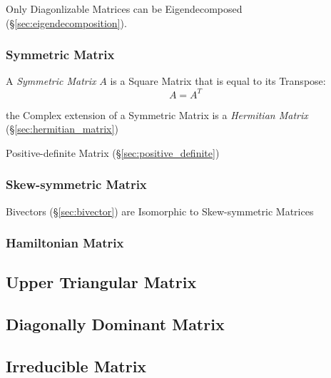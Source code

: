 Only Diagonlizable Matrices can be Eigendecomposed
(\S\ref{sec:eigendecomposition}).



\subsubsection{Symmetric Matrix}\label{sec:symmetric_matrix}

A \emph{Symmetric Matrix} $A$ is a Square Matrix that is equal to its
Transpose:
\[
  A = A^T
\]

the Complex extension of a Symmetric Matrix is a \emph{Hermitian Matrix}
(\S\ref{sec:hermitian_matrix})

Positive-definite Matrix (\S\ref{sec:positive_definite})



\subsubsection{Skew-symmetric Matrix}\label{sec:skew_symmetric}

Bivectors (\S\ref{sec:bivector}) are Isomorphic to Skew-symmetric Matrices



\subsubsection{Hamiltonian Matrix}\label{sec:hamiltonian_matrix}



\subsection{Upper Triangular Matrix}\label{sec:upper_triangular}

\subsection{Diagonally Dominant Matrix}\label{sec:diagonally_dominant}

\subsection{Irreducible Matrix}\label{sec:irreducible_matrix}

